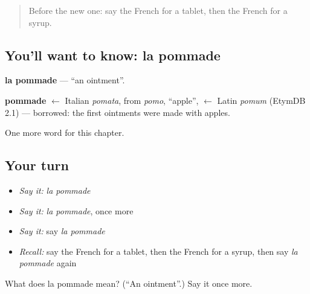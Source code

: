 \label{lesson:FR-C215-pommade}



\begin{quote}
Before the new one: say the French for a tablet, then the French for a syrup.
\end{quote}

\subsection*{You'll want to know: la pommade}
\textbf{la pommade} — \textquotedblleft{}an ointment\textquotedblright{}.

\begin{cousinweb}
\textbf{pommade} $\leftarrow$ Italian \emph{pomata}, from \emph{pomo}, \textquotedblleft{}apple\textquotedblright{}, $\leftarrow$ Latin \emph{pomum} (EtymDB 2.1) — borrowed: the first ointments were made with apples.
\end{cousinweb}

\begin{grammarlens}[title={What you've built}]
One more word for this chapter.
\end{grammarlens}

\subsection*{Your turn}
\begin{itemize}
\raggedright
  \item \emph{Say it:} \emph{la pommade}
  \item \emph{Say it:} \emph{la pommade}, once more
  \item \emph{Say it:} say \emph{la pommade}
  \item \emph{Recall:} say the French for a tablet, then the French for a syrup, then say \emph{la pommade} again
\end{itemize}

\begin{tcolorbox}[breakable,colback=teal!4,colframe=teal!35!black,title={Before you move on}]
What does la pommade mean? (\textquotedblleft{}An ointment\textquotedblright{}.) Say it once more.
\end{tcolorbox}

